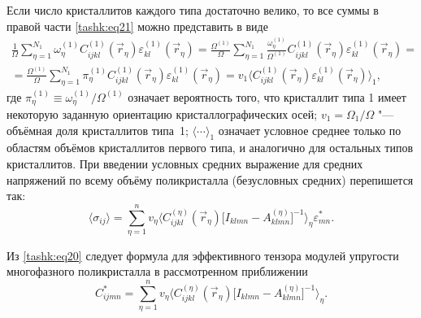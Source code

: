 Если число кристаллитов каждого типа достаточно велико, то все суммы в правой части \eqref{tashk:eq21} можно представить в виде
\begin{multline*}
\frac{1}{\Omega }\sum\limits_{\eta =1}^{N_1} \omega_\eta^{(1)}
C_{ijkl}^{(1)} (\vec {r}_\eta )\varepsilon _{kl}^{(1)}  (\vec {r}_\eta
)=\frac{\Omega ^{(1)}}{\Omega }\sum\limits_{\eta =1}^{N_1} \frac{\omega
_\eta^{(1)}}{\Omega^{(1)}}C_{ijkl}^{(1)} (\vec {r}_\eta )\varepsilon
_{kl}^{(1)} (\vec {r}_\eta )=\\
=\frac{\Omega^{(1)}}{\Omega
}\sum\limits_{\eta =1}^{N_1} \pi_\eta^{(1)} C_{ijkl}^{(1)} (\vec
{r}_\eta)\varepsilon _{kl}^{(1)} (\vec {r}_\eta )= 
v_1 \langle C_{ijkl}^{(1)} (\vec {r}_\eta )\varepsilon
_{kl}^{(1)} (\vec {r}_\eta )\rangle _1,
\end{multline*}
где $\pi_\eta^{(1)} \equiv \omega_\eta^{(1)}/\Omega^{(1)}$ 
означает вероятность того, что кристаллит типа 1 имеет некоторую заданную
ориентацию кристаллографических осей; $v_1 =\Omega _1 / \Omega$ "---
объёмная доля кристаллитов типа~1; $\langle \cdots \rangle _1$ означает
условное среднее только по областям объёмов кристаллитов первого типа, и
аналогично для остальных типов кристаллитов. При введении условных средних
выражение для средних напряжений по всему объёму поликристалла (безусловных
средних) перепишется так:
\begin{equation}
\label{tashk:eq22}
\langle \sigma _{ij} \rangle =\sum\limits_{\eta =1}^n v_\eta \bigl \langle C_{ijkl}^{(\eta )} (\vec {r}_\eta)
\bigl[ I_{klmn} -A_{klmn}^{(\eta )} \bigr]^{-1} \bigr\rangle_\eta \varepsilon_{mn}^\ast.
\end{equation}

Из \eqref{tashk:eq20} следует формула для эффективного тензора модулей упругости
многофазного поликристалла в рассмотренном приближении
\begin{equation}
\label{tashk:eq23}
C_{ijmn}^\ast =\sum\limits_{\eta =1}^n v_\eta 
\bigl \langle C_{ijkl}^{(\eta )} (\vec {r}_\eta )\bigl[ I_{klmn} -A_{klmn}^{(\eta )}  \bigr]^{-1} \bigr\rangle _\eta.
\end{equation}

